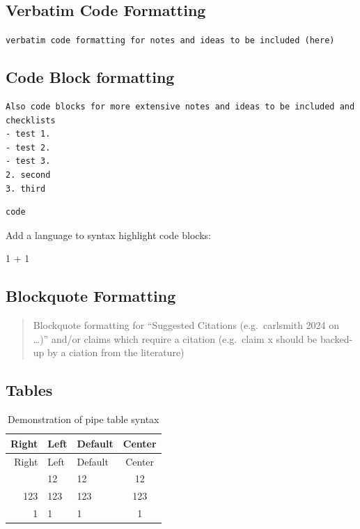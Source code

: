 \documentclass[
  11pt,
  letterpaper,
]{book}
\newenvironment{Shaded}{\begin{snugshade}}{\end{snugshade}}
\newcommand{\DecValTok}[1]{\textcolor[rgb]{0.68,0.00,0.00}{#1}}
\newcommand{\OperatorTok}[1]{\textcolor[rgb]{0.37,0.37,0.37}{#1}}
\begin{document}
\subsection*{Verbatim Code Formatting}\label{verbatim-code-formatting}

\texttt{verbatim\ code\ formatting\ for\ notes\ and\ ideas\ to\ be\ included\ (here)}

\subsection*{Code Block formatting}\label{code-block-formatting}

\begin{verbatim}
Also code blocks for more extensive notes and ideas to be included and checklists
- test 1. 
- test 2. 
- test 3.
2. second
3. third
\end{verbatim}

\begin{verbatim}
code
\end{verbatim}

Add a language to syntax highlight code blocks:

\begin{Shaded}
\begin{Highlighting}[]
\DecValTok{1} \OperatorTok{+} \DecValTok{1}
\end{Highlighting}
\end{Shaded}

\subsection*{Blockquote Formatting}\label{blockquote-formatting}

\begin{quote}
Blockquote formatting for ``Suggested Citations (e.g.~carlsmith 2024 on
\ldots)'' and/or claims which require a citation (e.g.~claim x should be
backed-up by a ciation from the literature)
\end{quote}

\subsection*{Tables}\label{tables}

\begin{longtable}[]{@{}rllc@{}}
\caption{Demonstration of pipe table
syntax}\label{tbl-letters}\tabularnewline
\toprule\noalign{}
Right & Left & Default & Center \\
\midrule\noalign{}
\endfirsthead
\toprule\noalign{}
Right & Left & Default & Center \\
\midrule\noalign{}
\endhead
\bottomrule\noalign{}
\endlastfoot
12 & 12 & 12 & 12 \\
123 & 123 & 123 & 123 \\
1 & 1 & 1 & 1 \\
\end{longtable}
\end{document}
